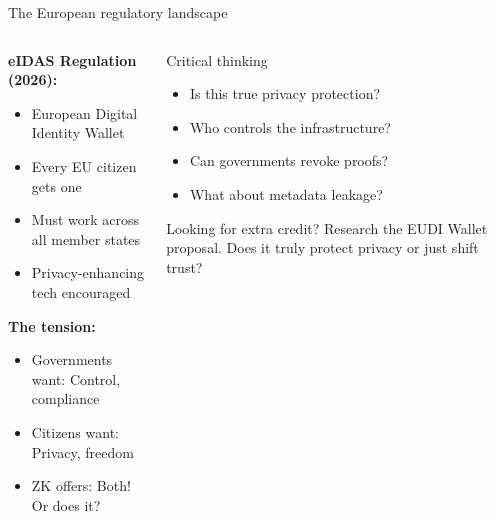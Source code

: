 \documentclass[aspectratio=169, lualatex, handout]{beamer}
\begin{document}
\begin{frame}{The European regulatory landscape}
	\begin{columns}[c]
		\begin{column}{0.5\textwidth}
			\textbf{eIDAS Regulation (2026):}
			\begin{itemize}
				\item European Digital Identity Wallet
				\item Every EU citizen gets one
				\item Must work across all member states
				\item Privacy-enhancing tech encouraged
			\end{itemize}
			\textbf{The tension:}
			\begin{itemize}
				\item Governments want: Control, compliance
				\item Citizens want: Privacy, freedom
				\item ZK offers: Both! Or does it?
			\end{itemize}
		\end{column}
		\begin{column}{0.5\textwidth}
			\begin{alertblock}{Critical thinking}
				\begin{itemize}
					\item Is this true privacy protection?
					\item Who controls the infrastructure?
					\item Can governments revoke proofs?
					\item What about metadata leakage?
				\end{itemize}
			\end{alertblock}
			\begin{exampleblock}{Looking for extra credit?}
				Research the EUDI Wallet proposal. Does it truly protect privacy or just shift trust?
			\end{exampleblock}
		\end{column}
	\end{columns}
\end{frame}
\end{document}
